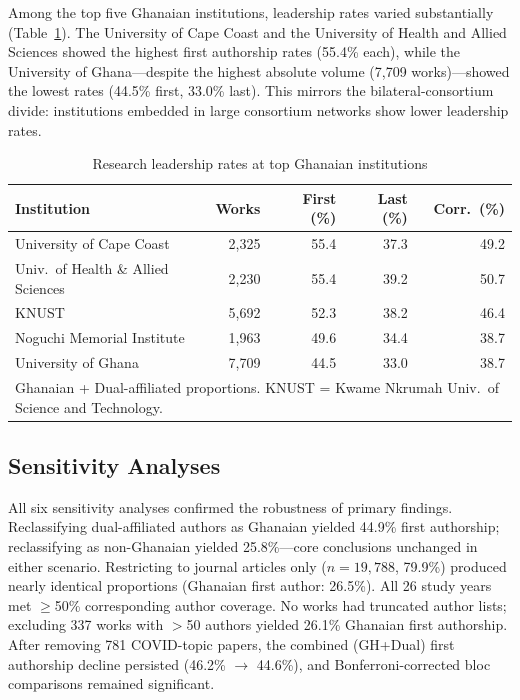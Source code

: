 \documentclass[12pt, a4paper]{article}
\begin{document}
Among the top five Ghanaian institutions, leadership rates varied substantially (Table~\ref{tab:institutions}). The University of Cape Coast and the University of Health and Allied Sciences showed the highest first authorship rates (55.4\% each), while the University of Ghana---despite the highest absolute volume (7,709 works)---showed the lowest rates (44.5\% first, 33.0\% last). This mirrors the bilateral-consortium divide: institutions embedded in large consortium networks show lower leadership rates.

\begin{table}[H]
\centering
\caption{Research leadership rates at top Ghanaian institutions}
\label{tab:institutions}
\small
\begin{tabular}{l r r r r}
\toprule
\textbf{Institution} & \textbf{Works} & \textbf{First (\%)} & \textbf{Last (\%)} & \textbf{Corr.\ (\%)} \\
\midrule
University of Cape Coast & 2,325 & 55.4 & 37.3 & 49.2 \\
Univ.\ of Health \& Allied Sciences & 2,230 & 55.4 & 39.2 & 50.7 \\
KNUST & 5,692 & 52.3 & 38.2 & 46.4 \\
Noguchi Memorial Institute & 1,963 & 49.6 & 34.4 & 38.7 \\
University of Ghana & 7,709 & 44.5 & 33.0 & 38.7 \\
\bottomrule
\multicolumn{5}{l}{\footnotesize Ghanaian + Dual-affiliated proportions. KNUST = Kwame Nkrumah Univ.\ of Science and Technology.} \\
\end{tabular}
\end{table}

\subsection{Sensitivity Analyses}

All six sensitivity analyses confirmed the robustness of primary findings. Reclassifying dual-affiliated authors as Ghanaian yielded 44.9\% first authorship; reclassifying as non-Ghanaian yielded 25.8\%---core conclusions unchanged in either scenario. Restricting to journal articles only ($n = 19{,}788$, 79.9\%) produced nearly identical proportions (Ghanaian first author: 26.5\%). All 26 study years met $\geq$50\% corresponding author coverage. No works had truncated author lists; excluding 337 works with $>$50 authors yielded 26.1\% Ghanaian first authorship. After removing 781 COVID-topic papers, the combined (GH+Dual) first authorship decline persisted (46.2\% $\rightarrow$ 44.6\%), and Bonferroni-corrected bloc comparisons remained significant.
\end{document}
